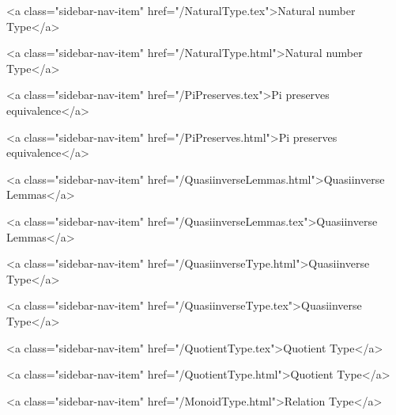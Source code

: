       
        
          <a class="sidebar-nav-item" href="/NaturalType.tex">Natural number Type</a>
        
      
    
      
        
          <a class="sidebar-nav-item" href="/NaturalType.html">Natural number Type</a>
        
      
    
      
        
          <a class="sidebar-nav-item" href="/PiPreserves.tex">Pi preserves equivalence</a>
        
      
    
      
        
          <a class="sidebar-nav-item" href="/PiPreserves.html">Pi preserves equivalence</a>
        
      
    
      
        
          <a class="sidebar-nav-item" href="/QuasiinverseLemmas.html">Quasiinverse Lemmas</a>
        
      
    
      
        
          <a class="sidebar-nav-item" href="/QuasiinverseLemmas.tex">Quasiinverse Lemmas</a>
        
      
    
      
        
          <a class="sidebar-nav-item" href="/QuasiinverseType.html">Quasiinverse Type</a>
        
      
    
      
        
          <a class="sidebar-nav-item" href="/QuasiinverseType.tex">Quasiinverse Type</a>
        
      
    
      
        
          <a class="sidebar-nav-item" href="/QuotientType.tex">Quotient Type</a>
        
      
    
      
        
          <a class="sidebar-nav-item" href="/QuotientType.html">Quotient Type</a>
        
      
    
      
        
          <a class="sidebar-nav-item" href="/MonoidType.html">Relation Type</a>
        
